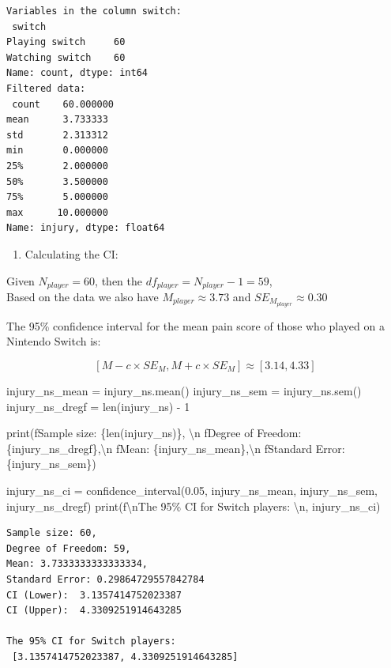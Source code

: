 \documentclass[
  a4paper,
  DIV=11,
  numbers=noendperiod]{scrartcl}
\newenvironment{Shaded}{\begin{snugshade}}{\end{snugshade}}
\newcommand{\BuiltInTok}[1]{\textcolor[rgb]{0.00,0.23,0.31}{#1}}
\newcommand{\CharTok}[1]{\textcolor[rgb]{0.13,0.47,0.30}{#1}}
\newcommand{\DecValTok}[1]{\textcolor[rgb]{0.68,0.00,0.00}{#1}}
\newcommand{\FloatTok}[1]{\textcolor[rgb]{0.68,0.00,0.00}{#1}}
\newcommand{\NormalTok}[1]{\textcolor[rgb]{0.00,0.23,0.31}{#1}}
\newcommand{\OperatorTok}[1]{\textcolor[rgb]{0.37,0.37,0.37}{#1}}
\newcommand{\SpecialCharTok}[1]{\textcolor[rgb]{0.37,0.37,0.37}{#1}}
\newcommand{\SpecialStringTok}[1]{\textcolor[rgb]{0.13,0.47,0.30}{#1}}
\providecommand{\tightlist}{%
  \setlength{\itemsep}{0pt}\setlength{\parskip}{0pt}}\usepackage{longtable,booktabs,array}
\begin{document}
\begin{verbatim}
Variables in the column switch: 
 switch
Playing switch     60
Watching switch    60
Name: count, dtype: int64
Filtered data: 
 count    60.000000
mean      3.733333
std       2.313312
min       0.000000
25%       2.000000
50%       3.500000
75%       5.000000
max      10.000000
Name: injury, dtype: float64
\end{verbatim}

\begin{enumerate}
\def\labelenumi{\arabic{enumi}.}
\setcounter{enumi}{1}
\tightlist
\item
  Calculating the CI:
\end{enumerate}

Given \(N_{player} = 60\), then the
\(df_{player} = N_{player} - 1 = 59\),\\
Based on the data we also have \(M_{player} \approx 3.73\) and
\(SE_{M_{player}} \approx 0.30\)

The 95\% confidence interval for the mean pain score of those who played
on a Nintendo Switch is:

\[
[M - c \times SE_M, M + c \times SE_M] \approx [3.14, 4.33]
\]

\begin{Shaded}
\begin{Highlighting}[numbers=left,,]
\NormalTok{injury\_ns\_mean }\OperatorTok{=}\NormalTok{ injury\_ns.mean()}
\NormalTok{injury\_ns\_sem }\OperatorTok{=}\NormalTok{ injury\_ns.sem()}
\NormalTok{injury\_ns\_dregf }\OperatorTok{=} \BuiltInTok{len}\NormalTok{(injury\_ns) }\OperatorTok{{-}} \DecValTok{1}

\BuiltInTok{print}\NormalTok{(}\SpecialStringTok{f\textquotesingle{}Sample size: }\SpecialCharTok{\{}\BuiltInTok{len}\NormalTok{(injury\_ns)}\SpecialCharTok{\}}\SpecialStringTok{, }\CharTok{\textbackslash{}n}\SpecialStringTok{\textquotesingle{}}
      \SpecialStringTok{f\textquotesingle{}Degree of Freedom: }\SpecialCharTok{\{}\NormalTok{injury\_ns\_dregf}\SpecialCharTok{\}}\SpecialStringTok{,}\CharTok{\textbackslash{}n}\SpecialStringTok{\textquotesingle{}}
      \SpecialStringTok{f\textquotesingle{}Mean: }\SpecialCharTok{\{}\NormalTok{injury\_ns\_mean}\SpecialCharTok{\}}\SpecialStringTok{,}\CharTok{\textbackslash{}n}\SpecialStringTok{\textquotesingle{}}
      \SpecialStringTok{f\textquotesingle{}Standard Error: }\SpecialCharTok{\{}\NormalTok{injury\_ns\_sem}\SpecialCharTok{\}}\SpecialStringTok{\textquotesingle{}}\NormalTok{)}

\NormalTok{injury\_ns\_ci }\OperatorTok{=}\NormalTok{ confidence\_interval(}\FloatTok{0.05}\NormalTok{, injury\_ns\_mean, injury\_ns\_sem, injury\_ns\_dregf)}
\BuiltInTok{print}\NormalTok{(}\SpecialStringTok{f\textquotesingle{}}\CharTok{\textbackslash{}n}\SpecialStringTok{The 95\% CI for Switch players: }\CharTok{\textbackslash{}n}\SpecialStringTok{\textquotesingle{}}\NormalTok{, injury\_ns\_ci)}
\end{Highlighting}
\end{Shaded}

\begin{verbatim}
Sample size: 60, 
Degree of Freedom: 59,
Mean: 3.7333333333333334,
Standard Error: 0.29864729557842784
CI (Lower):  3.1357414752023387
CI (Upper):  4.3309251914643285

The 95% CI for Switch players: 
 [3.1357414752023387, 4.3309251914643285]
\end{verbatim}
\end{document}

